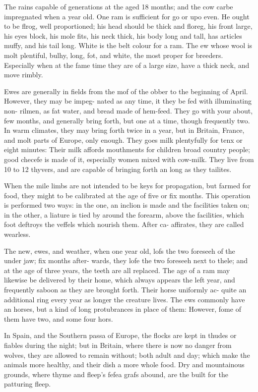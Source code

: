 \documentclass{article}
\begin{document}
The rains capable of generations at the aged 18 months; and the cow carbe impregnated when a year old. One ram is sufficient for go or upo even. He ought to be flrog, well proportioned; his head should be thick and floreg, his front large, his eyes block, his mole fits, his neck thick, his body long and tall, has articles muffy, and his tail long. White is the belt colour for a ram. The ew whose wool is molt plentiful, bulhy, long, fot, and white, the most proper for breeders. Especially when at the fame time they are of a large size, have a thick neck, and move rimbly.

Ewes are generally in fields from the mof of the obber to the beginning of April. However, they may be impeg- nated as any time, it they be fed with illuminating non- rilmen, as fat water, and bread made of hem-feed. They go with your about, few months, and generally bring forth, but one at a time, though frequently two. In warm climates, they may bring forth twice in a year, but in Britain, France, and molt parts of Europe, only enough. They goes milk plentyfully for tenx or eight minutes: Their milk affords mouthments for children broad country people; good checefe is made of it, especially women mixed with cow-milk. They live from 10 to 12 thyvers, and are capable of bringing forth an long as they tailites.

When the mile limbs are not intended to be keys for propagation, but farmed for food, they might to be calibrated at the age of five or fix months. This operation is performed two ways: in the one, an inclion is made and the facilities taken on; in the other, a liature is tied by around the forearm, above the facilities, which foot deftroys the veffels which nourish them. After ca- affirates, they are called wearless.

The new, ewes, and weather, when one year old, lofs the two foreseeh of the under jaw; fix months after- wards, they lofe the two foreseeh next to thele; and at the age of three years, the teeth are all replaced. The age of a ram may likewise be delivered by their home, which always appears the left year, and frequently saboon as they are brought forth. Their horse uniformly ac- quite an additional ring every year as longer the creature lives. The ews commonly have an horses, but a kind of long protubrances in place of them: However, fome of them have two, and some four hors.

In Spain, and the Southern passa of Europe, the flocks are kept in thudes or fiables during the night; but in Britain, where there is now no danger from wolves, they are allowed to remain without; both adult and day; which make the animals more healthy, and their dish a more whole food. Dry and mountainous grounds, where thyme and fleep's fefea grafs abound, are the built for the patturing fleep.
\end{document}
